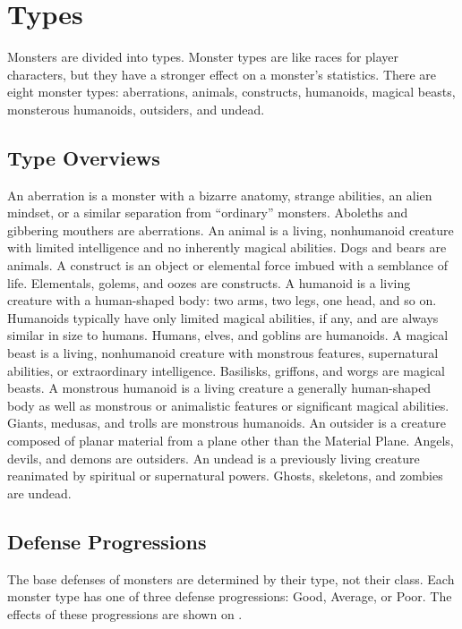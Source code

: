 \chapter{Types}\label{Types}

Monsters are divided into types.
Monster types are like races for player characters, but they have a stronger effect on a monster's statistics.
There are eight monster types: aberrations, animals, constructs, humanoids, magical beasts, monsterous humanoids, outsiders, and undead.

\section{Type Overviews}

     An aberration is a monster with a bizarre anatomy, strange abilities, an alien mindset, or a similar separation from ``ordinary'' monsters.
    Aboleths and gibbering mouthers are aberrations.
     An animal is a living, nonhumanoid creature with limited intelligence and no inherently magical abilities.
    Dogs and bears are animals.
     A construct is an object or elemental force imbued with a semblance of life.
    Elementals, golems, and oozes are constructs.
     A humanoid is a living creature with a human-shaped body: two arms, two legs, one head, and so on.
    Humanoids typically have only limited magical abilities, if any, and are always similar in size to humans.
    Humans, elves, and goblins are humanoids.
     A magical beast is a living, nonhumanoid creature with monstrous features, supernatural abilities, or extraordinary intelligence.
    Basilisks, griffons, and worgs are magical beasts.
     A monstrous humanoid is a living creature a generally human-shaped body as well as monstrous or animalistic features or significant magical abilities.
    Giants, medusas, and trolls are monstrous humanoids.
     An outsider is a creature composed of planar material from a plane other than the Material Plane.
    Angels, devils, and demons are outsiders.
     An undead is a previously living creature reanimated by spiritual or supernatural powers.
    Ghosts, skeletons, and zombies are undead.

\section{Defense Progressions}
    The base defenses of monsters are determined by their type, not their class.
    Each monster type has one of three defense progressions: Good, Average, or Poor.
    The effects of these progressions are shown on .


